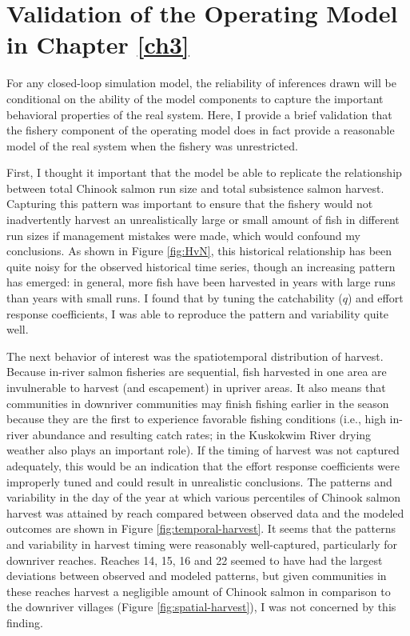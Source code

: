 \documentclass[12pt,]{book}
\theoremstyle{definition}
\theoremstyle{definition}
\theoremstyle{definition}
\theoremstyle{remark}
\begin{document}
\clearpage

\doublespacing

\chapter{Validation of the Operating Model in Chapter
\ref{ch3}}\label{validation-of-the-operating-model-in-chapter-refch3}

For any closed-loop simulation model, the reliability of inferences
drawn will be conditional on the ability of the model components to
capture the important behavioral properties of the real system. Here, I
provide a brief validation that the fishery component of the operating
model does in fact provide a reasonable model of the real system when
the fishery was unrestricted.

First, I thought it important that the model be able to replicate the
relationship between total Chinook salmon run size and total subsistence
salmon harvest. Capturing this pattern was important to ensure that the
fishery would not inadvertently harvest an unrealistically large or
small amount of fish in different run sizes if management mistakes were
made, which would confound my conclusions. As shown in Figure
\ref{fig:HvN}, this historical relationship has been quite noisy for the
observed historical time series, though an increasing pattern has
emerged: in general, more fish have been harvested in years with large
runs than years with small runs. I found that by tuning the catchability
(\(q\)) and effort response coefficients, I was able to reproduce the
pattern and variability quite well.

The next behavior of interest was the spatiotemporal distribution of
harvest. Because in-river salmon fisheries are sequential, fish
harvested in one area are invulnerable to harvest (and escapement) in
upriver areas. It also means that communities in downriver communities
may finish fishing earlier in the season because they are the first to
experience favorable fishing conditions (i.e., high in-river abundance
and resulting catch rates; in the Kuskokwim River drying weather also
plays an important role). If the timing of harvest was not captured
adequately, this would be an indication that the effort response
coefficients were improperly tuned and could result in unrealistic
conclusions. The patterns and variability in the day of the year at
which various percentiles of Chinook salmon harvest was attained by
reach compared between observed data and the modeled outcomes are shown
in Figure \ref{fig:temporal-harvest}. It seems that the patterns and
variability in harvest timing were reasonably well-captured,
particularly for downriver reaches. Reaches 14, 15, 16 and 22 seemed to
have had the largest deviations between observed and modeled patterns,
but given communities in these reaches harvest a negligible amount of
Chinook salmon in comparison to the downriver villages (Figure
\ref{fig:spatial-harvest}), I was not concerned by this finding.
\end{document}
